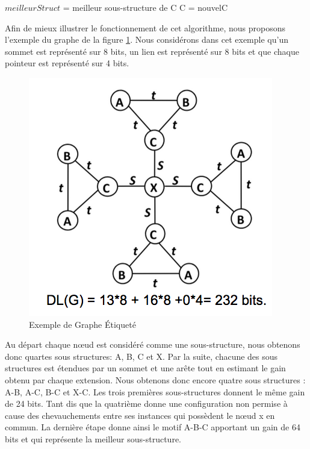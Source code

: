 \documentclass[a4paper,oneside,12pt]{report}
\theoremstyle{definition}
\begin{document}
\begin{enumerate}
\begin{algorithm}[H]
\begin{algorithmic} [1]
					\STATE $meilleurStruct$  = meilleur sous-structure de C
					\ENDIF
					\STATE C = nouvelC
					
				\end{algorithmic}
			\end{algorithm}
			
Afin de mieux illustrer le fonctionnement de cet algorithme, nous proposons l'exemple du graphe de la figure \ref{beam}. Nous considérons dans cet exemple qu'un sommet est représenté sur 8 bits, un lien est représenté sur 8 bits et que chaque pointeur est représenté sur 4 bits.


\begin{figure}[H]
	\centering
	
	\includegraphics[scale=0.5]{ressources/image/beam_search.png}
	\caption{Exemple de Graphe Étiqueté}
	\label{beam}
 \end{figure}
 
 Au départ chaque nœud est considéré comme une sous-structure, nous obtenons donc quartes sous structures:  A, B, C et X. Par la suite, chacune des sous structures  est étendues par un sommet et une arête tout en estimant le gain obtenu par chaque extension. Nous obtenons donc encore quatre sous structures : A-B, A-C, B-C et X-C. Les trois premières sous-structures donnent le même gain de 24 bits. Tant dis que la quatrième donne une configuration non permise à cause des chevauchements entre ses instances qui possèdent le nœud x  en commun.  La dernière étape donne ainsi le motif A-B-C apportant un gain de 64 bits et qui représente la meilleur sous-structure.  
 

\end{enumerate}
\end{document}
